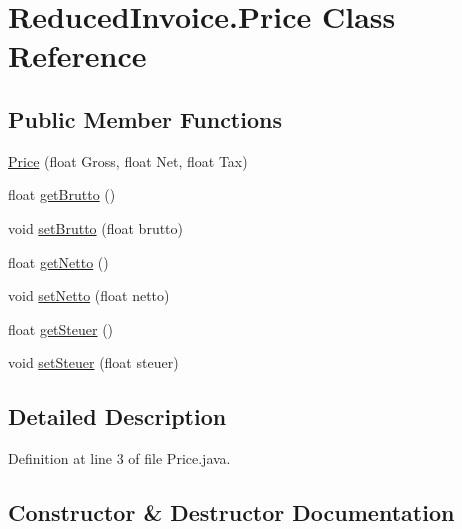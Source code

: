 \hypertarget{class_reduced_invoice_1_1_price}{}\section{Reduced\+Invoice.\+Price Class Reference}
\label{class_reduced_invoice_1_1_price}
\subsection*{Public Member Functions}
\begin{DoxyCompactItemize}
\item 
\hyperlink{class_reduced_invoice_1_1_price_a71e3c7eb5fff33614528ea23ee874305}{Price} (float Gross, float Net, float Tax)
\item 
float \hyperlink{class_reduced_invoice_1_1_price_a84adde0f6b666f80decce07b972f1915}{get\+Brutto} ()
\item 
void \hyperlink{class_reduced_invoice_1_1_price_aaceec653edcc3cfd04a518eec50a2e91}{set\+Brutto} (float brutto)
\item 
float \hyperlink{class_reduced_invoice_1_1_price_a691cd78d742511f2456c551ef4dc8a9c}{get\+Netto} ()
\item 
void \hyperlink{class_reduced_invoice_1_1_price_a6ab42d39a17504d35ae65b1cca9c7c65}{set\+Netto} (float netto)
\item 
float \hyperlink{class_reduced_invoice_1_1_price_a32f83ae377729e082f9b0c156a7fb9c2}{get\+Steuer} ()
\item 
void \hyperlink{class_reduced_invoice_1_1_price_a7b8bdad57935a486f86d70fb54694efb}{set\+Steuer} (float steuer)
\end{DoxyCompactItemize}


\subsection{Detailed Description}


Definition at line 3 of file Price.\+java.



\subsection{Constructor \& Destructor Documentation}
